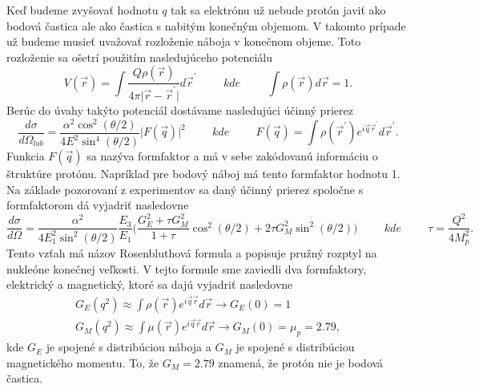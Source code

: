 \documentclass[../../main.tex]{subfiles}
\begin{document}
Keď budeme zvyšovať hodnotu $q$ tak sa elektrónu už nebude protón javiť ako bodová častica ale ako častica s nabitým konečným objemom. V takomto prípade už budeme musieť uvažovať rozloženie náboja v konečnom objeme. Toto rozloženie sa ošetrí použitím nasledujúceho potenciálu
$$ V({\vec{r}}) =\int \frac{Q\rho(\vec{r})}{4\pi \vert \vec{r}-\vec{r}^{\prime} \vert} d\vec{r}^{\prime} \hspace{1cm} kde \hspace{1cm} \int \rho(\vec{r})d\vec{r}=1 .$$
Berúc do úvahy takýto potenciál dostávame nasledujúci účinný prierez
\begin{equation}
\frac{d\sigma}{d\Omega_{lab}} = \frac{\alpha^2 \cos^2(\theta/2)}{4E^2 \sin^4(\theta/2)}\vert F(\vec{q}) \vert^2  \hspace{1cm} kde \hspace{1cm} F(\vec{q}) = \int \rho(\vec{r}^{\prime}) e^{i\vec{q}\vec{r}^{\prime}}d\vec{r}^{\prime}.
\label{sf2:mott}
\end{equation} 
Funkcia $F(\vec{q})$ sa nazýva formfaktor a má v sebe zakódovanú informáciu o štruktúre protónu. Napríklad pre bodový náboj má tento formfaktor hodnotu 1.
Na základe pozorovaní z experimentov sa daný účinný prierez spoločne s formfaktorom dá vyjadriť nasledovne
$$ \frac{d\sigma}{d\Omega} = \frac{\alpha^2}{4E_1^2\sin^2(\theta/2)} \frac{E_3}{E_1} \bigg( \frac{G^2_E + \tau G_M^2}{1+\tau}\cos^2(\theta/2)+2\tau G_M^2\sin^2(\theta/2) \bigg) \hspace{1cm} kde \hspace{1cm} \tau = \frac{Q^2}{4M^2_p}. $$
Tento vzťah má názov Rosenbluthová formula a popisuje pružný rozptyl na nukleóne konečnej veľkosti. V tejto formule sme zaviedli dva formfaktory, elektrický a magnetický, ktoré sa dajú vyjadriť nasledovne
\begin{equation}
\begin{gathered}
G_E(q^2) \approx \int \rho(\vec{r})e^{i\vec{q}\vec{r}} d\vec{r} \rightarrow G_E(0)=1  \\ 
G_M(q^2) \approx \int \mu(\vec{r})e^{i\vec{q}\vec{r}} d\vec{r} \rightarrow G_M(0)=\mu_{p}=2.79,
\end{gathered}
\end{equation} 
kde $G_E$ je spojené s distribúciou náboja a $G_M$ je spojené s distribúciou magnetického momentu. To, že $G_M=2.79$ znamená, že protón nie je bodová častica. 
\end{document}
